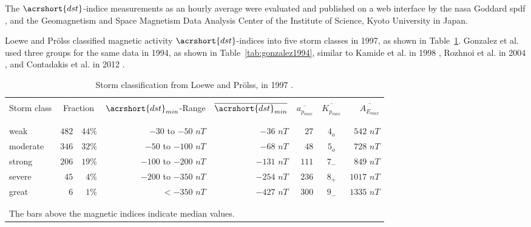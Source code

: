 \documentclass[sn-mathphys-num]{sn-jnl}%
\begin{document}
The $\acrshort{dst}$-indice measurements as an hourly average were evaluated and published on a web interface by the \acrshort{nasa} Goddard \acrshort{spdf} \cite{Papitashvili2024About, Papitashvili2024Explorer}, and the Geomagnetism and Space Magnetism Data Analysis Center of the Institute of Science, Kyoto University in Japan.

Loewe and Prölss \cite{loewe1997classification} classified magnetic activity $\acrshort{dst}$-indices into five storm classes in 1997, as shown in Table~\ref{tab:loewe1997}. Gonzalez et al. \cite{gonzalez1994geomagnetic} used three groups for the same data in 1994, as shown in Table~\ref{tab:gonzalez1994}, similar to Kamide et al. in 1998 \cite{kamide1998two}, Rozhnoi et al. in 2004 \cite{rozhnoi2004middle}, and Contadakis et al. in 2012 \cite{contadakis2012total}.

\begin{table}[!ht]
    \centering
    \caption{Storm classification from Loewe and Prölss, in 1997 \cite{loewe1997classification}.}
    \label{tab:loewe1997}
    \begin{tabular}{lrrrrrcr}
        \hline
        \\
        Storm class & \multicolumn{2}{c}{Fraction} & $\acrshort{dst}_{min}$-Range & $\overline{\acrshort{dst}_{min}}$ & $\overline{a_{p_{max}}}$ & $\overline{K_{p_{max}}}$ & $\overline{A_{E_{max}}}$ \\
        \\
        \hline
        \\
        weak & $482$ & $44\%$ & $-30$ to $-50$ $nT$ & $-36$ $nT$ & $27$ & $4_{o}$ & $542$ $nT$ \\
        moderate & $346$ & $32\%$ & $-50$ to $-100$ $nT$ & $-68$ $nT$ & $48$ & $5_{o}$ & $728$ $nT$ \\
        strong & $206$ & $19\%$ & $-100$ to $-200$ $nT$ & $-131$ $nT$ & $111$ & $7_{-}$ & $849$ $nT$ \\
        severe & $45$ & $4\%$ & $-200$ to $-350$ $nT$ & $-254$ $nT$ & $236$ & $8_{+}$ & $1017$ $nT$ \\
        great & $6$ & $1\%$ & $<-350$ $nT$ & $-427$ $nT$ & $300$ & $9_{-}$ & $1335$ $nT$ \\
        \\
        \hline
        \\
        \multicolumn{8}{l}{The bars above the magnetic indices indicate median values.} \\
    \end{tabular}
\end{table}
\end{document}
